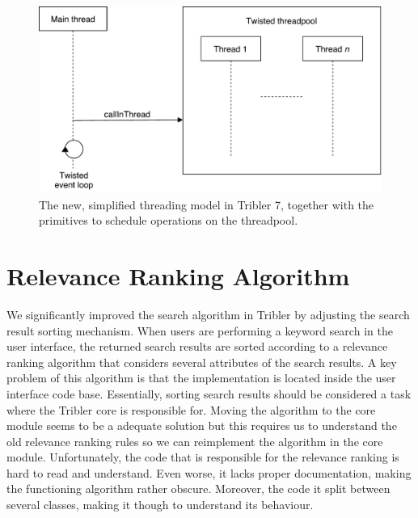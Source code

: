 \begin{figure}[h!]
	\centering
	\includegraphics[width=0.7\columnwidth]{images/improving_qa/new_threading_model_tribler}
	\caption{The new, simplified threading model in Tribler 7, together with the primitives to schedule operations on the threadpool.}
	\label{fig:new-threading-model}
\end{figure}

\section{Relevance Ranking Algorithm}
\label{sec:relevance-ranking-algorithm}
We significantly improved the search algorithm in Tribler by adjusting the search result sorting mechanism. When users are performing a keyword search in the user interface, the returned search results are sorted according to a relevance ranking algorithm that considers several attributes of the search results. A key problem of this algorithm is that the implementation is located inside the user interface code base. Essentially, sorting search results should be considered a task where the Tribler core is responsible for. Moving the algorithm to the core module seems to be a adequate solution but this requires us to understand the old relevance ranking rules so we can reimplement the algorithm in the core module. Unfortunately, the code that is responsible for the relevance ranking is hard to read and understand. Even worse, it lacks proper documentation, making the functioning algorithm rather obscure. Moreover, the code it split between several classes, making it though to understand its behaviour.

